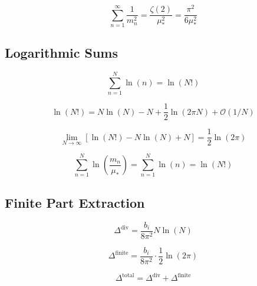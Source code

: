 \documentclass[11pt,a4paper]{article}
\theoremstyle{definition}
\begin{document}
\begin{equation}
\label{eq:kk_sum_3}
\sum_{n=1}^{\infty}\frac{1}{m_n^2} = \frac{\zeta(2)}{\mu_*^2} = \frac{\pi^2}{6\mu_*^2}
\end{equation}

\subsection{Logarithmic Sums}
\label{subsec:log_sums}

\begin{equation}
\label{eq:log_sum_1}
\sum_{n=1}^{N}\ln(n) = \ln(N!)
\end{equation}

\begin{equation}
\label{eq:log_sum_2}
\ln(N!) = N\ln(N) - N + \frac{1}{2}\ln(2\pi N) + \mathcal{O}(1/N)
\end{equation}

\begin{equation}
\label{eq:log_sum_3}
\lim_{N\to\infty}\left[\ln(N!) - N\ln(N) + N\right] = \frac{1}{2}\ln(2\pi)
\end{equation}

\begin{equation}
\label{eq:log_sum_4}
\sum_{n=1}^{N}\ln\left(\frac{m_n}{\mu_*}\right) = \sum_{n=1}^{N}\ln(n) = \ln(N!)
\end{equation}

\subsection{Finite Part Extraction}
\label{subsec:finite_part}

\begin{equation}
\label{eq:finite_1}
\Delta^{\text{div}} = \frac{b_i}{8\pi^2}N\ln(N)
\end{equation}

\begin{equation}
\label{eq:finite_2}
\Delta^{\text{finite}} = \frac{b_i}{8\pi^2}\cdot\frac{1}{2}\ln(2\pi)
\end{equation}

\begin{equation}
\label{eq:finite_3}
\Delta^{\text{total}} = \Delta^{\text{div}} + \Delta^{\text{finite}}
\end{equation}
\end{document}
